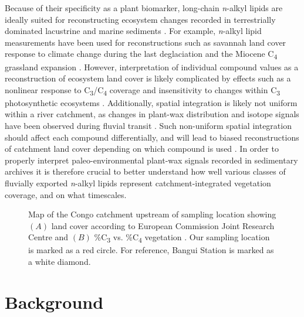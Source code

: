 Because of their specificity as a plant biomarker, long-chain \textit{n}-alkyl lipids are ideally suited for reconstructing ecosystem changes recorded in terrestrially dominated lacustrine and marine sediments \citep{Pancost:2004ij,Eglinton:2008hs,Castaneda:2011jb,Freeman:2014gi}. For example, \textit{n}-alkyl lipid  measurements have been used for reconstructions such as savannah land cover response to climate change during the last deglaciation\citep{Hughen:2004gc} and the Miocene C\textsubscript{4} grassland expansion \citep{Freeman:2001tv,Hoetzel:2013hj}. However, interpretation of individual compound  values as a reconstruction of ecosystem land cover is likely complicated by effects such as a nonlinear response to C\textsubscript{3}/C\textsubscript{4} coverage \citep{Garcin:2014hg} and insensitivity to changes within C\textsubscript{3} photosynthetic ecosystems \citep[\textit{\textit{i.e.}} woody vs. non-woody][]{Feakins:2013ks,Magill:2013ab,Magill:2013cz}. Additionally, spatial integration is likely not uniform within a river catchment, as changes in plant-wax distribution and isotope signals have been observed during fluvial transit \citep{Galy:2011hk,Galy:2011ix,Ponton:2014jr}. Such non-uniform spatial integration should affect each compound differentially, and will lead to biased reconstructions of catchment land cover depending on which compound is used \citep[\textit{e.g.}][]{Wang:2013jz}. In order to properly interpret paleo-environmental plant-wax signals recorded in sedimentary archives it is therefore crucial to better understand how well various classes of fluvially exported \textit{n}-alkyl lipids represent catchment-integrated vegetation coverage, and on what timescales.

\begin{figure}[t]
	\caption[Congo catchment map showing land cover and \%C\textsubscript{3} vs. \%C\textsubscript{4} vegetation]{Map of the Congo catchment upstream of sampling location showing $(A)$ land cover according to European Commission Joint Research Centre \citep{Mayaux:2004uw} and $(B)$ \%C\textsubscript{3} vs. \%C\textsubscript{4} vegetation \citep{Still:2010wh}. Our sampling location is marked as a red circle. For reference, Bangui Station \citep{Coynel:2005cn,Bouillon:2012cw,Bouillon:2014ko} is marked as a white diamond.}
	\label{Ch4Fig:1} 
\end{figure}

\section{Background}

